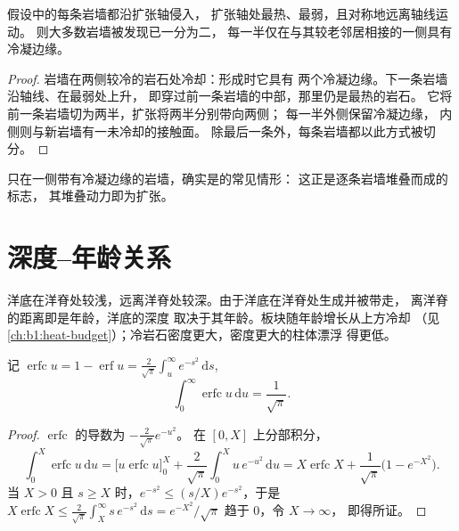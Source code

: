 \begin{proposition}[每条岩墙都切分其前一条]\label{prop:b1:rifts-ridges-margins:dykes}
假设中的每条岩墙都沿扩张轴侵入，
扩张轴处最热、最弱，且对称地远离轴线运动。
则大多数岩墙被发现已一分为二，
每一半仅在与其较老邻居相接的一侧具有冷凝边缘。
\end{proposition}

\begin{proof}
岩墙在两侧较冷的岩石处冷却：形成时它具有
两个冷凝边缘。下一条岩墙沿轴线、在最弱处上升，
即穿过前一条岩墙的中部，那里仍是最热的岩石。
它将前一条岩墙切为两半，扩张将两半分别带向两侧；
每一半外侧保留冷凝边缘，
内侧则与新岩墙有一未冷却的接触面。
除最后一条外，每条岩墙都以此方式被切分。
\end{proof}

只在一侧带有冷凝边缘的岩墙，确实是的常见情形：
这正是逐条岩墙堆叠而成的标志，
其堆叠动力即为扩张。


\section{深度–年龄关系}\label{sec:b1:rifts-ridges-margins:depth-age}

洋底在洋脊处较浅，远离洋脊处较深。由于洋底在洋脊处生成并被带走，
离洋脊的距离即是年龄，洋底的深度
取决于其年龄。板块随年龄增长从上方冷却
（见\cref{ch:b1:heat-budget}）；冷岩石密度更大，密度更大的柱体漂浮
得更低。

\begin{lemma}[误差函数的一个积分]\label{lem:b1:rifts-ridges-margins:erfc}
记 $\operatorname{erfc} u = 1 - \operatorname{erf} u =
\frac{2}{\sqrt\pi}\int_u^\infty e^{-s^2}\,\mathrm ds$,
\[
  \int_0^\infty \operatorname{erfc} u \,\mathrm du = \frac{1}{\sqrt\pi}.
\]
\end{lemma}

\begin{proof}
$\operatorname{erfc}$ 的导数为 $-\frac{2}{\sqrt\pi}e^{-u^2}$。
在 $[0, X]$ 上分部积分，
\[
  \int_0^X \operatorname{erfc} u\,\mathrm du
  = \bigl[u \operatorname{erfc} u\bigr]_0^X + \frac{2}{\sqrt\pi}\int_0^X u\,e^{-u^2}\,\mathrm du
  = X\operatorname{erfc} X + \frac{1}{\sqrt\pi}\bigl(1 - e^{-X^2}\bigr).
\]
当 $X > 0$ 且 $s \ge X$ 时，$e^{-s^2} \le (s/X)e^{-s^2}$，于是
$X\operatorname{erfc} X \le \frac{2}{\sqrt\pi}\int_X^\infty s\,e^{-s^2}\,\mathrm ds
= e^{-X^2}/\sqrt\pi$ 趋于 0，令 $X \to \infty$，
即得所证。
\end{proof}

